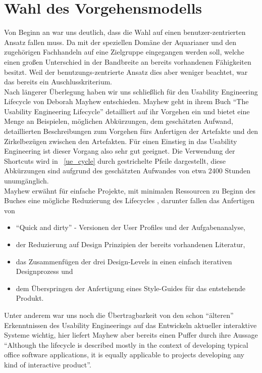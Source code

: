 \chapter{Wahl des Vorgehensmodells}
Von Beginn an war uns deutlich, dass die Wahl auf einen benutzer-zentrierten Ansatz fallen muss. Da mit der speziellen Domäne der Aquarianer und den zugehörigen Fachhandeln auf eine Zielgruppe eingegangen werden soll, welche einen großen Unterschied in der Bandbreite an bereits vorhandenen Fähigkeiten besitzt. Weil der benutzungs-zentrierte Ansatz dies aber weniger beachtet, war das bereits ein Auschlusskriterium.\\
 
Nach längerer Überlegung haben wir uns schließlich für den Usability Engineering Lifecycle von Deborah Mayhew entschieden. Mayhew geht in ihrem Buch ``The Usability Engineering Lifecycle'' detailliert auf ihr Vorgehen ein und bietet eine Menge an Beispielen, möglichen Abkürzungen, dem geschätzten Aufwand, detaillierten Beschreibungen zum Vorgehen fürs Anfertigen der Artefakte und den Zirkelbezügen zwischen den Artefakten. Für einen Einstieg in das Usability Engineering ist dieser Vorgang also sehr gut geeignet. 
Die Verwendung der Shortcuts wird in ~\ref{ue_cycle} durch gestrichelte Pfeile dargestellt, diese Abkürzungen sind aufgrund des geschätzten Aufwandes von etwa 2400 Stunden unumgänglich.\\
Mayhew erwähnt für einfache Projekte, mit minimalen Ressourcen zu Beginn des Buches eine mögliche Reduzierung des Lifecycles 
\cite[25]{Mayhew:UEL}, darunter fallen das Anfertigen von 
\begin{itemize}
 \item ``Quick and dirty'' - Versionen der User Profiles und der Aufgabenanalyse,
 \item der Reduzierung auf Design Prinzipien der bereits vorhandenen Literatur,
 \item das Zusammenfügen der drei Design-Levels in einen einfach iterativen Designprozess und
 \item dem Überspringen der Anfertigung eines Style-Guides für das entstehende Produkt.
\end{itemize}

Unter anderem war uns noch die Übertragbarkeit von den schon ``älteren'' Erkenntnissen des Usability Engineerings auf das Entwickeln aktueller interaktive Systeme wichtig, hier liefert Mayhew aber bereits einen Puffer durch ihre Aussage ``Although the lifecycle is described mostly in the context of developing typical office software applications, it is equally applicable to projects developing any kind of interactive product''. \cite[5]{Mayhew:UEL}

